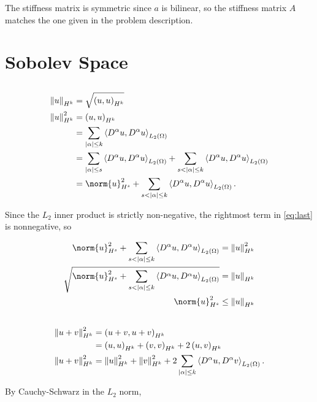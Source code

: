 \documentclass{hw-template}
\begin{document}
The stiffness matrix is symmetric since $a$ is bilinear, so the stiffness matrix $A$ matches the one given in the problem description.

\section{Sobolev Space}

\subsection{}

\begin{align}
    \hn{u} &= \sqrt{\iph{u}{u}}\\
    \hn{u}^2 &= \iph{u}{u}\\
             &= \sum_{|\alpha|\leq k} \ipl{D^{\alpha}u}{D^{\alpha}u}\\
             &= \sum_{|\alpha|\leq s} \ipl{D^{\alpha}u}{D^{\alpha}u} + \sum_{s < |\alpha|\leq k} \ipl{D^{\alpha}u}{D^{\alpha}u}\\
             &= \norm{u}_{H^s}^2 + \sum_{s < |\alpha|\leq k} \ipl{D^{\alpha}u}{D^{\alpha}u}.\label{eq:last}
\end{align}

Since the $L_2$ inner product is strictly non-negative, the rightmost term in \autoref{eq:last} is nonnegative, so

\begin{align}
    \norm{u}_{H^s}^2 + \sum_{s < |\alpha|\leq k} \ipl{D^{\alpha}u}{D^{\alpha}u} = \hn{u}^2\\
    \sqrt{\norm{u}_{H^s}^2 + \sum_{s < |\alpha|\leq k} \ipl{D^{\alpha}u}{D^{\alpha}u}} = \hn{u}\\
    \norm{u}_{H^s}^2  \leq \hn{u}
\end{align}

\subsection{}

\begin{align}
    \left\| {u+v} \right\|_{H^k}^2 &= \left({u+v}, {u+v}\right)_{H^k}\\
               &= \left({u}, {u}\right)_{H^k} + \left({v}, {v}\right)_{H^k} + 2 \left({u}, {v}\right)_{H^k}\\
    \left\| {u+v} \right\|_{H^k}^2 &= \left\| {u} \right\|_{H^k}^2 + \left\| {v} \right\|_{H^k}^2 + 2 \sum_{|\alpha|\leq k}\left\langle{D^{\alpha}u}, {D^{\alpha}v}\right\rangle_{L_2(\Omega)}.
\end{align}

By Cauchy-Schwarz in the $L_2$ norm,
\end{document}
